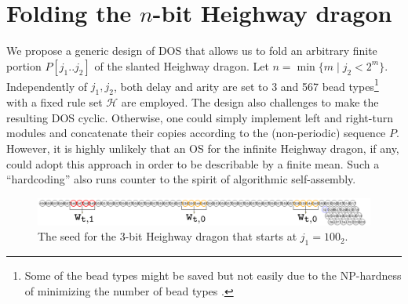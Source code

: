 \documentclass[runningheads]{llncs}
\begin{document}
	\section{Folding the $n$-bit Heighway dragon}

We propose a generic design of DOS that allows us to fold an arbitrary finite portion $P[j_1 .. j_2]$ of the slanted Heighway dragon. 
Let $n = \min\{m \mid j_2 < 2^m\}$. 
Independently of $j_1, j_2$, both delay and arity are set to 3 and 567 bead types\footnote{Some of the bead types might be saved but not easily due to the NP-hardness of minimizing the number of bead types \cite{HanKim2017}.} with a fixed rule set $\mathcal{H}$ are employed. 
The design also challenges to make the resulting DOS cyclic. 
Otherwise, one could simply implement left and right-turn modules and concatenate their copies according to the (non-periodic) sequence $P$. 
However, it is highly unlikely that an OS for the infinite Heighway dragon, if any, could adopt this approach in order to be describable by a finite mean. 
Such a ``hardcoding'' also runs counter to the spirit of algorithmic self-assembly. 

\begin{figure}[tb]
\includegraphics[width=\linewidth]{Figs/seed_sample2.png}
\caption{The seed for the 3-bit Heighway dragon that starts at $j_1 = 100_2$.}
\label{fig:seed}
\end{figure}
\end{document}
